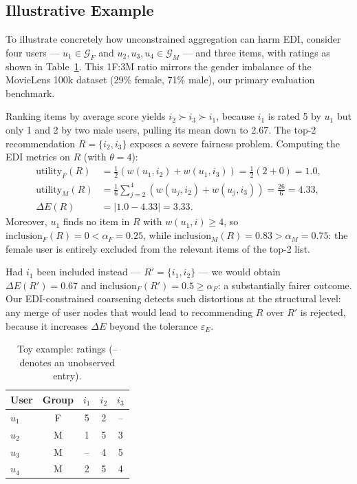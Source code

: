 \documentclass[runningheads]{llncs}
\begin{document}
\subsection{Illustrative Example}

To illustrate concretely how unconstrained aggregation can harm EDI, consider
four users --- $u_1 \in \mathcal{G}_F$ and $u_2, u_3, u_4 \in \mathcal{G}_M$
--- and three items, with ratings as shown in Table~\ref{tab:toy}. This 1F:3M ratio mirrors the gender imbalance of the MovieLens 100k dataset
(29\% female, 71\% male), our primary evaluation benchmark.


Ranking items by average score yields $i_2 \succ i_3 \succ i_1$, because $i_1$
is rated 5 by $u_1$ but only 1 and 2 by two male users, pulling its mean down
to 2.67. The top-2 recommendation $R = \{i_2, i_3\}$ exposes a severe fairness
problem. Computing the EDI metrics on $R$ (with $\theta = 4$):
\begin{align*}
  \mathrm{utility}_F(R) &= \tfrac{1}{2}(w(u_1,i_2)+w(u_1,i_3))
                         = \tfrac{1}{2}(2+0) = 1.0, \\
  \mathrm{utility}_M(R) &= \tfrac{1}{6}\sum_{j=2}^{4}(w(u_j,i_2)+w(u_j,i_3))
                         = \tfrac{26}{6} = 4.33, \\
  \Delta E(R) &= |1.0 - 4.33| = 3.33.
\end{align*}
Moreover, $u_1$ finds no item in $R$ with $w(u_1,i) \geq 4$, so
$\mathrm{inclusion}_F(R) = 0 < \alpha_F = 0.25$, while
$\mathrm{inclusion}_M(R) = 0.83 > \alpha_M = 0.75$: the female user is
entirely excluded from the relevant items of the top-2 list.

Had $i_1$ been included instead --- $R' = \{i_1, i_2\}$ --- we would obtain
$\Delta E(R') = 0.67$ and $\mathrm{inclusion}_F(R') = 0.5 \geq \alpha_F$: a
substantially fairer outcome. Our EDI-constrained coarsening detects such
distortions at the structural level: any merge of user nodes that would lead
to recommending $R$ over $R'$ is rejected, because it increases $\Delta E$
beyond the tolerance $\varepsilon_E$.

\begin{table}[H]
\centering
\caption{Toy example: ratings (-- denotes an unobserved entry).}
\label{tab:toy}
\begin{tabular}{lcccc}
\hline
User & Group & $i_1$ & $i_2$ & $i_3$ \\
\hline
$u_1$ & F & 5  & 2  & --  \\
$u_2$ & M & 1  & 5  & 3   \\
$u_3$ & M & -- & 4  & 5   \\
$u_4$ & M & 2  & 5  & 4   \\
\hline
\end{tabular}
\end{table}
\end{document}
